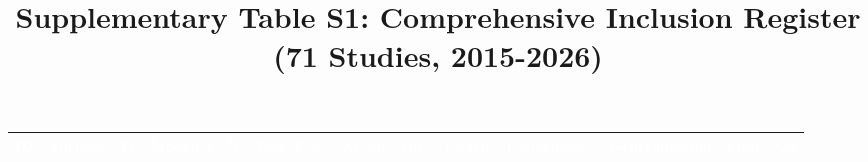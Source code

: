 \documentclass[11pt,a4paper]{article}
\begin{document}
\title{Supplementary Table S1: Comprehensive Inclusion Register (71 Studies, 2015-2026)}
\author{}
\date{}
\maketitle

{\small
\begin{longtable}{|p{0.6cm}|p{1.8cm}|p{0.5cm}|p{1.2cm}|p{0.6cm}|p{1.0cm}|p{1.0cm}|p{0.8cm}|p{1.0cm}|p{1.0cm}|p{0.6cm}|p{0.6cm}|}

\hline
\rowcolor{headerblue}
\textcolor{white}{\textbf{ID}} &
\textcolor{white}{\textbf{Authors}} &
\textcolor{white}{\textbf{Yr}} &
\textcolor{white}{\textbf{Modality}} &
\textcolor{white}{\textbf{N}} &
\textcolor{white}{\textbf{Task Type}} &
\textcolor{white}{\textbf{Architecture}} &
\textcolor{white}{\textbf{Metric}} &
\textcolor{white}{\textbf{Performance}} &
\textcolor{white}{\textbf{Generalization}} &
\textcolor{white}{\textbf{Code}} &
\textcolor{white}{\textbf{QS}} \\
\hline
\endhead


\end{longtable}}
\end{document}

